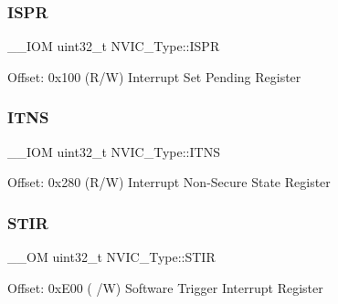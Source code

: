 \subsubsection{\texorpdfstring{ISPR}{ISPR}}
{\footnotesize\ttfamily \+\_\+\+\_\+\+I\+OM uint32\+\_\+t N\+V\+I\+C\+\_\+\+Type\+::\+I\+S\+PR}

Offset\+: 0x100 (R/W) Interrupt Set Pending Register \mbox{\label{struct_n_v_i_c___type_a4940c96f11d1c95d95a28e388f04d6d6}} 
\subsubsection{\texorpdfstring{ITNS}{ITNS}}
{\footnotesize\ttfamily \+\_\+\+\_\+\+I\+OM uint32\+\_\+t N\+V\+I\+C\+\_\+\+Type\+::\+I\+T\+NS}

Offset\+: 0x280 (R/W) Interrupt Non-\/\+Secure State Register \mbox{\label{struct_n_v_i_c___type_a37de89637466e007171c6b135299bc75}} 
\subsubsection{\texorpdfstring{STIR}{STIR}}
{\footnotesize\ttfamily \+\_\+\+\_\+\+OM uint32\+\_\+t N\+V\+I\+C\+\_\+\+Type\+::\+S\+T\+IR}

Offset\+: 0x\+E00 ( /W) Software Trigger Interrupt Register 

